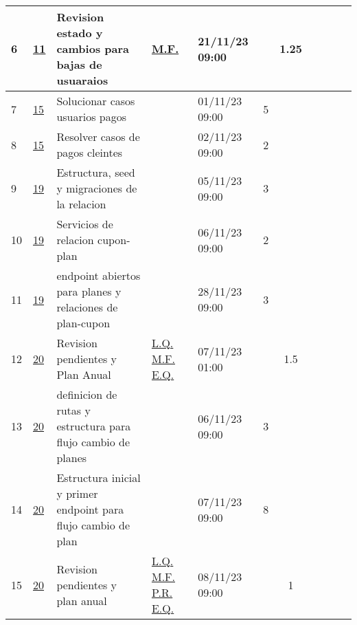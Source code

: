 \documentclass{article}
\begin{document}
\begin{longtable}{|m{0.5cm}|m{1.2cm}|p{5cm}|m{1.5cm}|m{1.5cm}||c|c|c|c|c|c|    |}
                 \label{6}6  &  \hyperref[11]{\color{blue}11}  & Revision estado y cambios para bajas de usuaraios &  
                  \hyperref[M.F.]{\color{blue}M.F.}  & 21/11/23 09:00  &  & 1.25 &  &  &  & \\ \hline 

                 \label{7}7  &  \hyperref[15]{\color{blue}15}  & Solucionar casos usuarios pagos &  
                 & 01/11/23 09:00  & 5 &  &  &  &  & \\ \hline 

                 \label{8}8  &  \hyperref[15]{\color{blue}15}  & Resolver casos de pagos cleintes &  
                 & 02/11/23 09:00  & 2 &  &  &  &  & \\ \hline 

                 \label{9}9  &  \hyperref[19]{\color{blue}19}  & Estructura, seed y migraciones de la relacion &  
                 & 05/11/23 09:00  & 3 &  &  &  &  & \\ \hline 

                 \label{10}10  &  \hyperref[19]{\color{blue}19}  & Servicios de relacion cupon-plan &  
                 & 06/11/23 09:00  & 2 &  &  &  &  & \\ \hline 

                 \label{11}11  &  \hyperref[19]{\color{blue}19}  & endpoint abiertos para planes y relaciones de plan-cupon &  
                 & 28/11/23 09:00  & 3 &  &  &  &  & \\ \hline 

                 \label{12}12  &  \hyperref[20]{\color{blue}20}  & Revision pendientes y Plan Anual &  
                  \hyperref[L.Q.]{\color{blue}L.Q.} \newline  \hyperref[M.F.]{\color{blue}M.F.} \newline  \hyperref[E.Q.]{\color{blue}E.Q.}  & 07/11/23 01:00  &  & 1.5 &  &  &  & \\ \hline 

                 \label{13}13  &  \hyperref[20]{\color{blue}20}  & definicion de rutas y estructura para flujo cambio de planes &  
                 & 06/11/23 09:00  & 3 &  &  &  &  & \\ \hline 

                 \label{14}14  &  \hyperref[20]{\color{blue}20}  & Estructura inicial y primer endpoint para flujo cambio de plan &  
                 & 07/11/23 09:00  & 8 &  &  &  &  & \\ \hline 

                 \label{15}15  &  \hyperref[20]{\color{blue}20}  & Revision pendientes y plan anual &  
                  \hyperref[L.Q.]{\color{blue}L.Q.} \newline  \hyperref[M.F.]{\color{blue}M.F.} \newline  \hyperref[P.R.]{\color{blue}P.R.} \newline  \hyperref[E.Q.]{\color{blue}E.Q.}  & 08/11/23 09:00  &  & 1 &  &  &  & \\ \hline 


\end{longtable}
\end{document}
